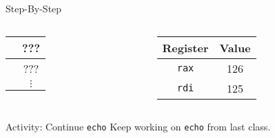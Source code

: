 \documentclass[hyphens,aspectratio=169]{beamer}
\begin{document}
\begin{frame}[fragile]{Step-By-Step}
\begin{columns}
\begin{column}{0.33\textwidth}
{\begin{tabular}{c|c|}
                & ??? \\
                \hline
                & ??? \\
                \hline
                & $\vdots$
            \end{tabular}}
        \end{column}
        \begin{column}{0.33\textwidth}
            \begin{tabular}{| c | c |}
                \hline
                Register & Value \\
                \hline
                \texttt{rax} & 126 \\
                \hline
                \texttt{rdi} & 125 \\
                \hline
            \end{tabular}
        \end{column}
    \end{columns}
\end{frame}

\begin{frame}[fragile]{Activity: Continue \texttt{echo}}
    Keep working on \texttt{echo} from last class.
\end{frame}
\end{document}
